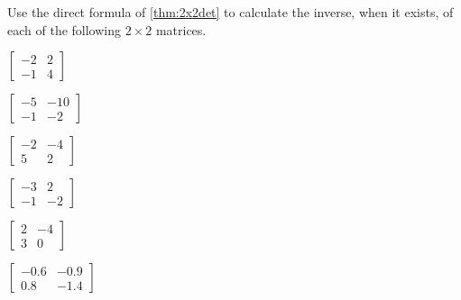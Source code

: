 \begin{exercise} \label{ex:2x2det} 
Use the direct formula of \cref{thm:2x2det} to calculate the inverse, when it exists, of each of the following \(2\times2\) matrices.
\begin{Parts}
\item \(\begin{bmatrix} -2&2
\\-1&4 \end{bmatrix}\)

\item \(\begin{bmatrix} -5&-10
\\-1&-2 \end{bmatrix}\)

\item \(\begin{bmatrix} -2&-4
\\5&2 \end{bmatrix}\)

\item \(\begin{bmatrix} -3&2
\\-1&-2 \end{bmatrix}\)

\begin{reduce}
\item \(\begin{bmatrix} 2&-4
\\3&0 \end{bmatrix}\)

\item \(\begin{bmatrix} -0.6&-0.9
\\0.8&-1.4 \end{bmatrix}\)


\end{reduce}
\end{Parts}
\end{exercise}
